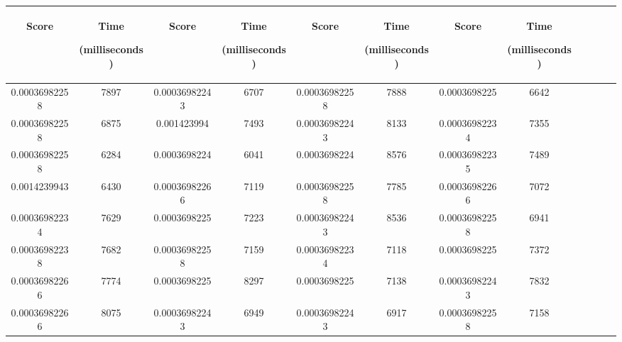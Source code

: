 \begin {table}[h]
  \centering
  \begin{tabular}{|c|c|c|c|c|c|c|c|c|c|c|c|} 
  \midrule
 \begin{sideways}Score\end{sideways}& \begin{sideways}Time\end{sideways} \begin{sideways} (milliseconds)\end{sideways}& \begin{sideways}Score\end{sideways}& \begin{sideways}Time\end{sideways}  \begin{sideways}(milliseconds)\end{sideways}& \begin{sideways}Score\end{sideways}& \begin{sideways}Time\end{sideways}  \begin{sideways}(milliseconds)\end{sideways}& \begin{sideways}Score\end{sideways}& \begin{sideways}Time\end{sideways}  \begin{sideways} (milliseconds)\end{sideways}\\
\midrule
0.00036982258&7897&0.00036982243&6707&0.00036982258&7888&0.0003698225&6642\\
\midrule
0.00036982258&6875&0.001423994&7493&0.00036982243&8133&0.00036982234&7355\\
\midrule
0.00036982258&6284&0.0003698224&6041&0.0003698224&8576&0.00036982235&7489\\
\midrule
0.0014239943&6430&0.00036982266&7119&0.00036982258&7785&0.00036982266&7072\\
\midrule
0.00036982234&7629&0.0003698225&7223&0.00036982243&8536&0.00036982258&6941\\
\midrule
0.00036982238&7682&0.00036982258&7159&0.00036982234&7118&0.0003698225&7372\\
\midrule
0.00036982266&7774&0.0003698225&8297&0.0003698225&7138&0.00036982243&7832\\
\midrule
0.00036982266&8075&0.00036982243&6949&0.00036982243&6917&0.00036982258&7158\\

\end{tabular}
\end{table}
